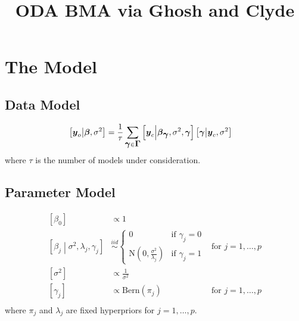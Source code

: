 \documentclass[fleqn]{article}
\title{ODA BMA via Ghosh and Clyde}
\def\bm#1{\mbox{\boldmath $#1$}}
\begin{document}
\section{The Model}
\subsection{Data Model}
%
\begin{align*}
%
\left[ \bm{y}_o \middle| \bm{\beta}, \sigma^2 \right] & = \frac{1} {\tau} \sum_{\bm{\gamma} \in \bm{\Gamma}} \left[ \bm{y}_c \middle| \bm{\beta}_{\bm{\gamma}}, \sigma^2, \bm{\gamma} \right] \left[ \bm{\gamma} \middle| \bm{y}_c, \sigma^2 \right]
%
\end{align*}
where $\tau$ is the number of models under consideration.
\subsection{Parameter Model}
\begin{align*}
%
\left[ \beta_0 \right] & \propto 1\\
%
\left[ \beta_j \middle| \sigma^2, \lambda_j, \gamma_j \right] & \stackrel{iid} {\sim} \begin{cases} 0 & \mbox{if } \gamma_j = 0\\ \mbox{N}\left( 0, \frac{\sigma^2} {\lambda_j} \right) & \mbox{if } \gamma_j = 1 \end{cases} & \mbox{for } j = 1, \ldots , p \\
%
\left[ \sigma^2 \right] & \propto \frac{1} {\sigma^2} \\
%
\left[ \gamma_j \right] & \propto \mbox{Bern} \left( \pi_j \right) & \mbox{for } j = 1, \ldots, p\\
%
\end{align*}
where $\pi_j$ and $\lambda_j$ are fixed hyperpriors for $j = 1, \ldots, p$.%
\end{document}
